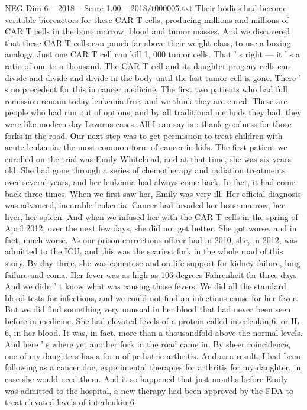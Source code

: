 \begin{textsample}{NEG Dim 6 – 2018 – Score 1.00 – 2018/t000005.txt}
Their bodies had become veritable bioreactors for these CAR T cells, producing millions and millions of CAR T cells in the bone marrow, blood and tumor masses.
And we discovered that these CAR T cells can punch far above their weight class, to use a boxing analogy.
Just one CAR T cell can kill 1, 000 tumor cells.
That ' s right — it ' s a ratio of one to a thousand.
The CAR T cell and its daughter progeny cells can divide and divide and divide in the body until the last tumor cell is gone.
There ' s no precedent for this in cancer medicine.
The first two patients who had full remission remain today leukemia-free, and we think they are cured.
These are people who had run out of options, and by all traditional methods they had, they were like modern-day Lazarus cases.
All I can say is : thank goodness for those forks in the road.
Our next step was to get permission to treat children with acute leukemia, the most common form of cancer in kids.
The first patient we enrolled on the trial was Emily Whitehead, and at that time, she was six years old.
She had gone through a series of chemotherapy and radiation treatments over several years, and her leukemia had always come back.
In fact, it had come back three times.
When we first saw her, Emily was very ill.
Her official diagnosis was advanced, incurable leukemia.
Cancer had invaded her bone marrow, her liver, her spleen.
And when we infused her with the CAR T cells in the spring of April 2012, over the next few days, she did not get better.
She got worse, and in fact, much worse.
As our prison corrections officer had in 2010, she, in 2012, was admitted to the ICU, and this was the scariest fork in the whole road of this story.
By day three, she was comatose and on life support for kidney failure, lung failure and coma.
Her fever was as high as 106 degrees Fahrenheit for three days.
And we didn ' t know what was causing those fevers.
We did all the standard blood tests for infections, and we could not find an infectious cause for her fever.
But we did find something very unusual in her blood that had never been seen before in medicine.
She had elevated levels of a protein called interleukin-6, or IL-6, in her blood.
It was, in fact, more than a thousandfold above the normal levels.
And here ' s where yet another fork in the road came in.
By sheer coincidence, one of my daughters has a form of pediatric arthritis.
And as a result, I had been following as a cancer doc, experimental therapies for arthritis for my daughter, in case she would need them.
And it so happened that just months before Emily was admitted to the hospital, a new therapy had been approved by the FDA to treat elevated levels of interleukin-6.

\end{textsample}
